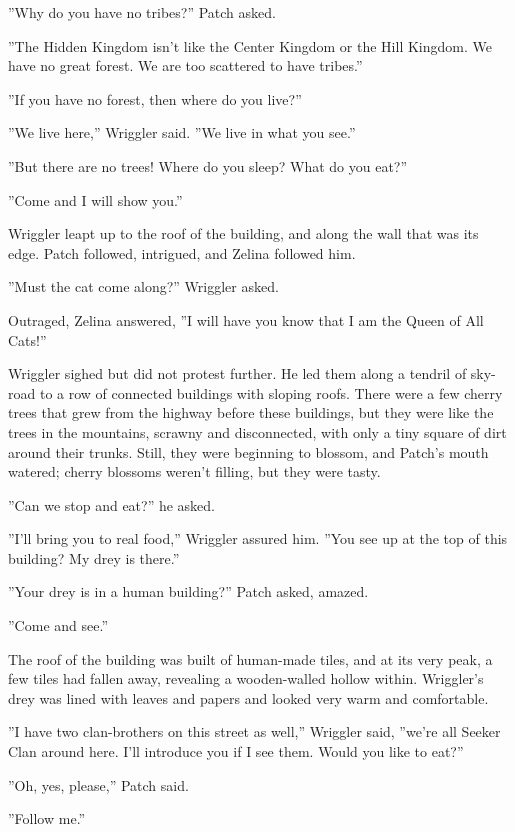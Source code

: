 \documentclass[12pt]{book}
\begin{document}
 ''Why do you have no tribes?'' Patch asked.\par
 ''The Hidden Kingdom isn't like the Center Kingdom or the Hill Kingdom. We have no great forest. We are too scattered to have tribes.''\par
 ''If you have no forest, then where do you live?''\par
 ''We live here,'' Wriggler said. ''We live in what you see.''\par
 ''But there are no trees! Where do you sleep? What do you eat?''\par
 ''Come and I will show you.''\par
 Wriggler leapt up to the roof of the building, and along the wall that was its edge. Patch followed, intrigued, and Zelina followed him.\par
 ''Must the cat come along?'' Wriggler asked.\par
 Outraged, Zelina answered, ''I will have you know that I am the Queen of All Cats!''\par
 Wriggler sighed but did not protest further. He led them along a tendril of sky-road to a row of connected buildings with sloping roofs. There were a few cherry trees that grew from the highway before these buildings, but they were like the trees in the mountains, scrawny and disconnected, with only a tiny square of dirt around their trunks. Still, they were beginning to blossom, and Patch's mouth watered; cherry blossoms weren't filling, but they were tasty.\par
 ''Can we stop and eat?'' he asked.\par
 ''I'll bring you to real food,'' Wriggler assured him. ''You see up at the top of this building? My drey is there.''\par
 ''Your drey is in a human building?'' Patch asked, amazed.\par
''Come and see.''\par
The roof of the building was built of human-made tiles, and at its very peak, a few tiles had fallen away, revealing a wooden-walled hollow within. Wriggler's drey was lined with leaves and papers and looked very warm and comfortable.\par
''I have two clan-brothers on this street as well,'' Wriggler said, ''we're all Seeker Clan around here. I'll introduce you if I see them. Would you like to eat?''\par
''Oh, yes, please,'' Patch said.\par
''Follow me.''\par
\end{document}
